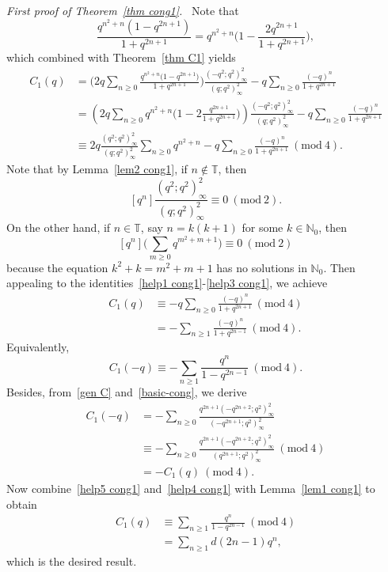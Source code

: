 \documentclass[reqno]{amsart}
\theoremstyle{definition}
\theoremstyle{plain}
\theoremstyle{remark}
\numberwithin{equation}{section}
\newcommand{\Mod}[1]{\ (\mathrm{mod}\ #1)}
\newcommand{\fr}{\frac}
\begin{document}
%
\emph{First proof of Theorem~\ref{thm cong1}.\ }
Note that
\[
\fr{q^{n^2+n}(1-q^{2n+1})}{1+q^{2n+1}} = q^{n^2+n} \Big( 1-\fr{2 q^{2n+1}}{1+q^{2n+1}} \Big),
\]
which combined with Theorem~\ref{thm C1} yields
\begin{align}
C_1(q) &= \Big(2q\sum_{n\geq 0} \fr{q^{n^{2}+n}\bigl(1-q^{2n+1}\bigr)}{1+q^{2n+1}}\Big) \fr{(-q^2;q^2)_\infty^2}{(q;q^2)_\infty^2}
-q\sum_{n\geq 0}\fr{(-q)^{n}}{1+q^{2n+1}} \nonumber \\
&=\left(2q\sum_{n\geq 0} q^{n^{2}+n} \Big(1-2\fr{q^{2n+1}}{1+q^{2n+1}}\Big) \right)\fr{(-q^2;q^2)_\infty^2}{(q;q^2)_\infty^2}
-q\sum_{n\geq 0}\fr{(-q)^{n}}{1+q^{2n+1}} \nonumber \\
&\equiv 2q\fr{(q^2;q^2)_\infty^2}{(q;q^2)_\infty^2} \sum_{n\geq 0} q^{n^{2}+n} - q\sum_{n\geq 0}\fr{(-q)^{n}}{1+q^{2n+1}} \Mod{4}. \label{help1 cong1}
\end{align}
Note that by Lemma~\ref{lem2 cong1}, if $n\not\in\mathbb{T}$, then
\begin{equation}\label{help2 cong1}
[q^n]\fr{(q^2;q^2)_\infty^2}{(q;q^2)_\infty^2} \equiv 0\Mod{2}.
\end{equation}
On the other hand, if $n\in\mathbb{T}$, say $n=k(k+1)$ for some $k\in\mathbb{N}_0$, then
\begin{equation}\label{help3 cong1}
[q^n] \Big(\sum_{m\geq 0} q^{m^2+m+1} \Big) \equiv 0\Mod{2}
\end{equation}
because the equation $k^2+k = m^2+m+1$ has no solutions in $\mathbb{N}_0$.
Then appealing to the identities~\eqref{help1 cong1}-\eqref{help3 cong1}, we achieve
\begin{align*}
C_1(q) &\equiv -q\sum_{n\geq 0}\fr{(-q)^{n}}{1+q^{2n+1}} \Mod{4} \\
& = -\sum_{n\geq 1} \fr{(-q)^n}{1+q^{2n-1}} \Mod{4}.
\end{align*}
Equivalently,
\begin{equation}\label{help4 cong1}
C_1(-q) \equiv -\sum_{n\geq 1} \fr{q^n}{1-q^{2n-1}} \Mod{4}.
\end{equation}
Besides, from~\eqref{gen C} and~\eqref{basic-cong},
we derive
\begin{align}
C_1(-q) &= -\sum_{n\geq 0}\fr{q^{2n+1} (-q^{2n+2};q^2)_\infty^2}{(-q^{2n+1};q^2)_\infty^2}  \nonumber \\
&\equiv -\sum_{n\geq 0}\fr{q^{2n+1} (-q^{2n+2};q^2)_\infty^2}{(q^{2n+1};q^2)_\infty^2} \Mod{4} \nonumber \\
&= -C_1(q) \Mod{4}. \label{help5 cong1}
\end{align}
Now combine~\eqref{help5 cong1} and~\eqref{help4 cong1} with Lemma~\ref{lem1 cong1} to obtain
\begin{align*}
C_1(q)&\equiv \sum_{n\geq 1} \fr{q^n}{1-q^{2n-1}} \Mod{4} \\
&= \sum_{n\geq 1} d(2n-1)q^n,
\end{align*}
which is the desired result.
%
\end{document}

